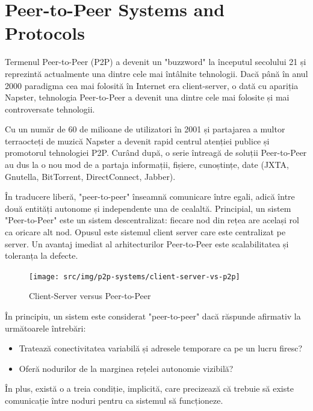 
\chapter{Peer-to-Peer Systems and Protocols}
\label{chapter:p2p-systems}

Termenul Peer-to-Peer (P2P) a devenit un "buzzword" la începutul secolului 21
și reprezintă actualmente una dintre cele mai întâlnite tehnologii. Dacă până
în anul 2000 paradigma cea mai folosită în Internet era client-server, o dată
cu apariția Napster, tehnologia Peer-to-Peer a devenit una dintre cele mai
folosite și mai controversate tehnologii.

Cu un număr de 60 de milioane de utilizatori în 2001 și partajarea  a multor
terraocteți de muzică Napster a devenit rapid centrul atenției publice și
promotorul tehnologiei P2P. Curând după, o serie întreagă de soluții
Peer-to-Peer au dus la o nou mod de a partaja informații, fișiere, cunoștințe,
date (JXTA, Gnutella, BitTorrent, DirectConnect, Jabber).

În traducere liberă, "peer-to-peer" înseamnă comunicare între egali, adică
între două entități autonome și independente una de cealaltă. Principial, un
sistem "Peer-to-Peer" este un sistem descentralizat: fiecare nod din rețea are
același rol ca oricare alt nod. Opusul este sistemul client server care este
centralizat pe server. Un avantaj imediat al arhitecturilor Peer-to-Peer este
scalabilitatea și toleranța la defecte.

\begin{figure}
  \centering
  \texttt{[image: src/img/p2p-systems/client-server-vs-p2p]}
  \caption{Client-Server versus Peer-to-Peer}
  \label{fig:p2p-systems:client-server-vs-p2p}
\end{figure}

În principiu, un sistem este considerat "peer-to-peer" dacă răspunde afirmativ
la următoarele întrebări:
\begin{itemize}
  \item Tratează conectivitatea variabilă și adresele temporare ca pe un lucru
  firesc?
  \item Oferă nodurilor de la marginea rețelei autonomie vizibilă?
\end{itemize}

În plus, există o a treia condiție, implicită, care precizează că trebuie să
existe comunicație între noduri pentru ca sistemul să funcționeze.

